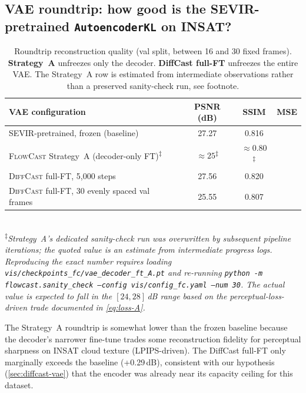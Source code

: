 \documentclass[11pt,a4paper]{article}
\begin{document}
\subsection{VAE roundtrip: how good is the {SEVIR}-pretrained
\texttt{AutoencoderKL} on INSAT?}
\label{sec:vae-results}

\begin{table}[h]
\centering\small
\caption{Roundtrip reconstruction quality (val split, between 16 and 30
fixed frames). \textbf{Strategy~A} unfreezes only the decoder.
\textbf{DiffCast full-FT} unfreezes the entire {VAE}. The Strategy~A row is
estimated from intermediate observations rather than a preserved
sanity-check run, see footnote.}
\label{tab:vae-roundtrip}
\begin{tabular}{lccc}
\toprule
{VAE} configuration & PSNR (dB) & SSIM & MSE \\
\midrule
{SEVIR}-pretrained, frozen (baseline)        & 27.27 & 0.816 & \\
\textsc{FlowCast} Strategy~A (decoder-only FT)\textsuperscript{$\ddagger$} & $\approx 25$\textsuperscript{$\ddagger$} & $\approx 0.80$\textsuperscript{$\ddagger$} & \\
\textsc{DiffCast} full-FT, 5{,}000 steps       & 27.56 & 0.820 & \\
\textsc{DiffCast} full-FT, 30 evenly spaced val frames
                                                & 25.55 & 0.807 & \\
\bottomrule
\end{tabular}
\\[0.3em]
\footnotesize\textsuperscript{$\ddagger$}\textit{Strategy~A's dedicated
sanity-check run was overwritten by subsequent pipeline iterations; the
quoted value is an estimate from intermediate progress logs. Reproducing
the exact number requires loading
\texttt{vis/checkpoints\_fc/vae\_decoder\_ft\_A.pt} and re-running
\texttt{python -m flowcast.sanity\_check --config vis/config\_fc.yaml --num 30}.
The actual value is expected to fall in the $[24,28]$\,dB range based on
the perceptual-loss-driven trade documented in \cref{eq:loss-A}.}
\end{table}

The Strategy~A roundtrip is somewhat lower than the frozen baseline because
the decoder's narrower fine-tune trades some reconstruction fidelity for
perceptual sharpness on INSAT cloud texture (LPIPS-driven). The DiffCast
full-FT only marginally exceeds the baseline (+0.29\,dB), consistent with
our hypothesis (\cref{sec:diffcast-vae}) that the encoder was already near
its capacity ceiling for this dataset.
\end{document}
